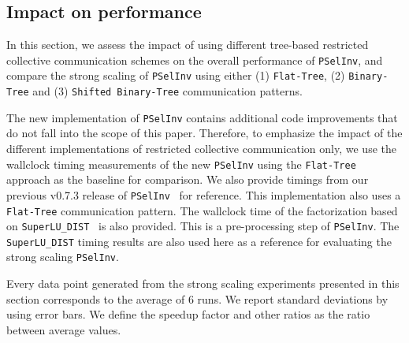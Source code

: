 \documentclass{acm_proc_article-sp}
\newcommand{\pselinv}{\texttt{PSelInv}\xspace}
\newcommand{\superlu}{\texttt{SuperLU\_DIST}\xspace}
\newcommand{\flattree}{\texttt{Flat-Tree}\xspace}
\newcommand{\btree}{\texttt{Binary-Tree}\xspace}
\newcommand{\modbtree}{\texttt{Shifted Binary-Tree}\xspace}
\begin{document}
\subsection{Impact on performance}

In this section, we assess the impact of using different tree-based 
restricted collective communication schemes on the overall 
performance of \pselinv, and compare the strong scaling of 
\pselinv using either (1) \flattree,
(2) \btree
and (3) \modbtree communication patterns. 



The new implementation of \pselinv contains additional code
improvements that do not fall into the scope of this paper. Therefore,
to emphasize the impact of the different implementations of 
restricted collective communication only, we use the wallclock timing 
measurements of the new \pselinv using the \flattree approach
as the baseline for comparison.
We also provide timings from our previous v0.7.3 release of
\pselinv~\cite{JacquelinLinYang2014} for reference.
This implementation also uses a \flattree communication pattern. 
The wallclock time of the  factorization based on
\superlu~\cite{LiDemmel2003} is also provided. This is a pre-processing
step of \pselinv. The \superlu timing results are also used here as a
reference for evaluating the strong scaling \pselinv.

Every data point generated from the strong scaling experiments presented 
in this section corresponds to the average of 6 runs.
We report standard deviations by using error bars. We define 
the speedup factor and other ratios as the ratio between average values.

\begin{figure*}[htbp]
\centering
{}



\caption{Running times of \pselinv for two sample matrices }
\end{figure*}
\end{document}
